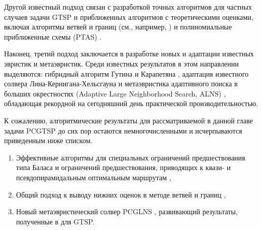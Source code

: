 Другой известный подход связан
с разработкой точных алгоритмов для частных случаев задачи GTSP
и приближенных алгоритмов с теоретическими оценками,
включая алгоритмы ветвей и границ
(см., например, \cite{FishGonToth1997, Yuan2020})
и полиномиальные приближенные схемы (PTAS)
\cite{FerGriSit2006, KhN-PSIM2017}.

Наконец,
третий подход заключается в разработке
новых и адаптации известных эвристик и метаэвристик.
Среди известных результатов в этом направлении выделяются:
гибридный алгоритм Гутина и Карапетяна \cite{Gutin-2010},
адаптация известного солвера Лина-Кернигана-Хельсгауна \cite{Helsgaun-2015}
и метаэвристика адаптивного поиска в больших окрестностях
(Adaptive Large Neighborhood Search, ALNS)
\cite{SMITH20171},
обладающая рекордной на сегодняшний день практической производительностью.

К сожалению,
алгоритмические результаты для рассматриваемой
в данной главе задачи PCGTSP
до сих пор остаются немногочисленными и исчерпываются
приведенным ниже списком.
\begin{enumerate}
  \item
  Эффективные алгоритмы для специальных ограничений предшествования
  типа Баласа
  \cite{Balas-Sim2001, ChenKhKh2016, CKK-IFAC2016}
  и ограничений предшествования, приводящих к
  квази- и псевдопирамидальным оптимальным маршрутам
  \cite{KhN-OPTA2018,KhN-AMAI-2020},
  \item
  Общий подход к выводу нижних оценок в методе ветвей и границ
  \cite{SALMAN2020163},
  \item
  Новый метаэвристический солвер PCGLNS
  \cite{KKP-optima2020, bi:PCGLNS},
  развивающий результаты, полученные в
  \cite{SMITH20171}
  для GTSP.
\end{enumerate}
